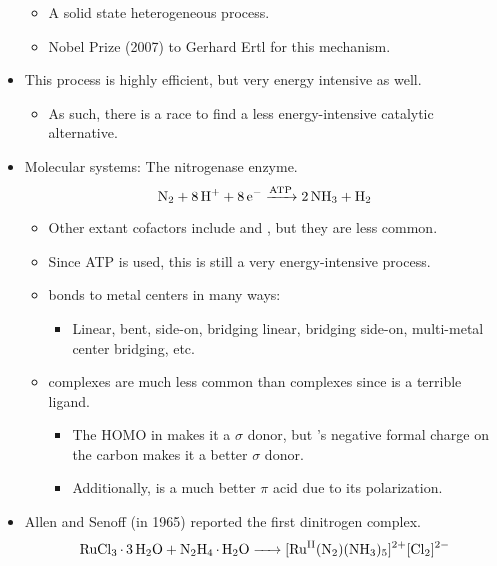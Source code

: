 \documentclass[../notes.tex]{subfiles}
\begin{document}
\begin{itemize}
\begin{itemize}
        \item A solid state heterogeneous process.
        \item Nobel Prize (2007) to Gerhard Ertl for this mechanism.
    \end{itemize}
    \item This process is highly efficient, but very energy intensive as well.
    \begin{itemize}
        \item As such, there is a race to find a less energy-intensive catalytic alternative.
    \end{itemize}
    \item Molecular systems: The nitrogenase enzyme.
    \begin{equation*}
        \ce{N2 + 8H+ + 8e- ->[ATP] 2NH3 + H2}
    \end{equation*}
    \begin{itemize}
        \item Other extant cofactors include  and , but they are less common.
        \item Since ATP is used, this is still a very energy-intensive process.
        \item {} bonds to metal centers in many ways:
        \begin{itemize}
            \item Linear, bent, side-on, bridging linear, bridging side-on, multi-metal center bridging, etc.
        \end{itemize}
        \item {} complexes are much less common than  complexes since  is a terrible ligand.
        \begin{itemize}
            \item The HOMO in  makes it a $\sigma$ donor, but 's negative formal charge on the carbon makes it a better $\sigma$ donor.
            \item Additionally,  is a much better $\pi$ acid due to its polarization.
        \end{itemize}
    \end{itemize}
    \item Allen and Senoff (in 1965) reported the first dinitrogen complex.
    \begin{equation*}
        \ce{RuCl3*3H2O + N2H4*H2O -> [Ru^{II}(N2)(NH3)5]^2+[Cl2]^2-}
    \end{equation*}
    \begin{itemize}

\end{itemize}
\end{itemize}
\end{document}
